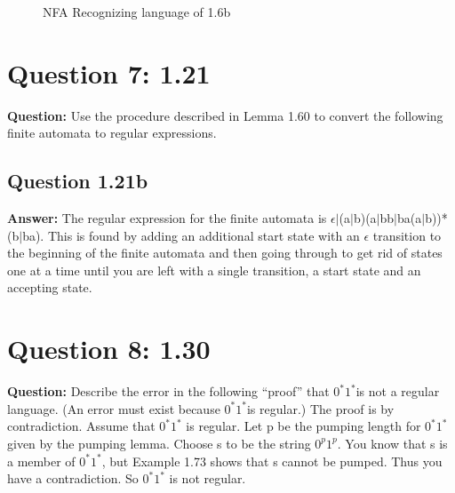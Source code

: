 \documentclass[12pt]{article}
\begin{document}
\begin{figure}[ht] %
\centering %
\caption{NFA Recognizing language of 1.6b}
\label{fig:question 6}
\end{figure}

\section*{Question 7: 1.21}
{\bfseries Question: }Use the procedure described in Lemma 1.60 to convert the following finite automata to regular expressions. 


\subsection*{Question 1.21b}
{\bfseries Answer:} The regular expression for the finite automata is $\epsilon$$|$(a$|$b)(a$|$bb$|$ba(a$|$b))*(b$|$ba). This is found by adding an additional start state with an $\epsilon$ transition to the beginning of the finite automata and then going through to get rid of states one at a time until you are left with a single transition, a start state and an accepting state.

\section*{Question 8: 1.30}
{\bfseries Question:} Describe the error in the following “proof” that $0^{*}$$1^{*}$is not a regular language. (An error must exist because $0^{*}$$1^{*}$is regular.) The proof is by contradiction. Assume that $0^{*}$$1^{*}$ is regular. Let p be the pumping length for $0^{*}$$1^{*}$ given by the pumping lemma. Choose s to be the string $0^p$$1^p$. You know that s is a member of $0^{*}$$1^{*}$, but Example 1.73 shows that s cannot be pumped. Thus you have a contradiction. So $0^{*}$$1^{*}$ is not regular. 
\\
\end{document}
